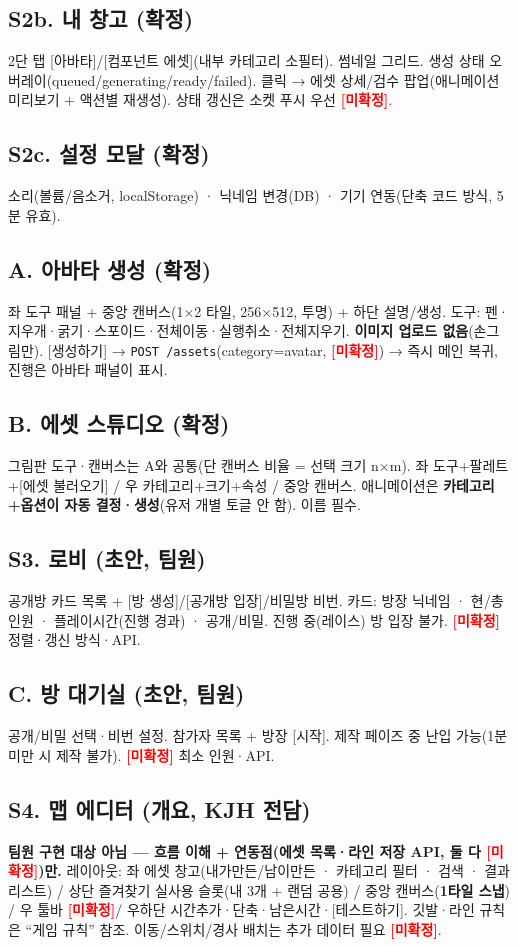 \documentclass[11pt]{article}
\newcommand{\tbd}{\textcolor{red}{\textbf{[미확정]}}}
\begin{document}
\subsection{S2b. 내 창고 (확정)}
2단 탭 [아바타]/[컴포넌트 에셋](내부 카테고리 소필터). 썸네일 그리드. 생성 상태 오버레이(queued/generating/ready/failed). 클릭 → 에셋 상세/검수 팝업(애니메이션 미리보기 + 액션별 재생성). 상태 갱신은 소켓 푸시 우선 \tbd.

\subsection{S2c. 설정 모달 (확정)}
소리(볼륨/음소거, localStorage) · 닉네임 변경(DB) · 기기 연동(단축 코드 방식, 5분 유효).

\subsection{A. 아바타 생성 (확정)}
좌 도구 패널 + 중앙 캔버스(1$\times$2 타일, 256$\times$512, 투명) + 하단 설명/생성. 도구: 펜·지우개·굵기·스포이드·전체이동·실행취소·전체지우기. \textbf{이미지 업로드 없음}(손그림만). [생성하기] → \texttt{POST /assets}(category=avatar, \tbd) → 즉시 메인 복귀, 진행은 아바타 패널이 표시.

\subsection{B. 에셋 스튜디오 (확정)}
그림판 도구·캔버스는 A와 공통(단 캔버스 비율 = 선택 크기 n$\times$m). 좌 도구+팔레트+[에셋 불러오기] / 우 카테고리+크기+속성 / 중앙 캔버스. 애니메이션은 \textbf{카테고리+옵션이 자동 결정·생성}(유저 개별 토글 안 함). 이름 필수.

\subsection{S3. 로비 (초안, 팀원)}
공개방 카드 목록 + [방 생성]/[공개방 입장]/비밀방 비번. 카드: 방장 닉네임 · 현/총 인원 · 플레이시간(진행 경과) · 공개/비밀. 진행 중(레이스) 방 입장 불가. \tbd{} 정렬·갱신 방식·API.

\subsection{C. 방 대기실 (초안, 팀원)}
공개/비밀 선택·비번 설정. 참가자 목록 + 방장 [시작]. 제작 페이즈 중 난입 가능(1분 미만 시 제작 불가). \tbd{} 최소 인원·API.

\subsection{S4. 맵 에디터 (개요, KJH 전담)}
\textbf{팀원 구현 대상 아님 — 흐름 이해 + 연동점(에셋 목록·라인 저장 API, 둘 다 \tbd)만.}
레이아웃: 좌 에셋 창고(내가만든/남이만든 · 카테고리 필터 · 검색 · 결과 리스트) / 상단 즐겨찾기 실사용 슬롯(내 3개 + 랜덤 공용) / 중앙 캔버스(\textbf{1타일 스냅}) / 우 툴바 \tbd / 우하단 시간추가·단축·남은시간·[테스트하기]. 깃발·라인 규칙은 ``게임 규칙'' 참조. 이동/스위치/경사 배치는 추가 데이터 필요 \tbd.
\end{document}
